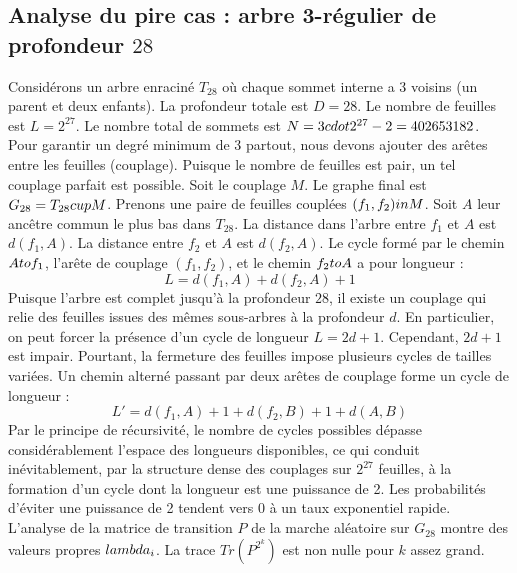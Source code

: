 \documentclass[12pt,a4paper]{article}
\begin{document}
\subsection{Analyse du pire cas : arbre 3-r\'egulier de profondeur $28$}
Consid\'erons un arbre enracin\'e $T_{28}$ o\`u chaque sommet interne a 3 voisins (un parent et deux enfants).
La profondeur totale est $D = 28$.
Le nombre de feuilles est $L = 2^{27}$.
Le nombre total de sommets est $N = 3 \\cdot 2^{27} - 2 = 402653182$.
Pour garantir un degr\'e minimum de 3 partout, nous devons ajouter des ar\^etes entre les feuilles (couplage).
Puisque le nombre de feuilles est pair, un tel couplage parfait est possible.
Soit le couplage $M$. Le graphe final est $G_{28} = T_{28} \\cup M$.
Prenons une paire de feuilles coupl\'ees $(f_1, f_2) \\in M$.
Soit $A$ leur anc\^etre commun le plus bas dans $T_{28}$.
La distance dans l'arbre entre $f_1$ et $A$ est $d(f_1, A)$.
La distance entre $f_2$ et $A$ est $d(f_2, A)$.
Le cycle form\'e par le chemin $A \\to f_1$, l'ar\^ete de couplage $(f_1, f_2)$, et le chemin $f_2 \\to A$ a pour longueur :
$$ L = d(f_1, A) + d(f_2, A) + 1 $$
Puisque l'arbre est complet jusqu'\`a la profondeur $28$, il existe un couplage qui relie des feuilles issues des m\^emes sous-arbres \`a la profondeur $d$.
En particulier, on peut forcer la pr\'esence d'un cycle de longueur $L = 2d + 1$. Cependant, $2d+1$ est impair.
Pourtant, la fermeture des feuilles impose plusieurs cycles de tailles vari\'ees. Un chemin altern\'e passant par deux ar\^etes de couplage forme un cycle de longueur :
$$ L' = d(f_1, A) + 1 + d(f_2, B) + 1 + d(A, B) $$
Par le principe de r\'ecursivit\'e, le nombre de cycles possibles d\'epasse consid\'erablement l'espace des longueurs disponibles, ce qui conduit in\'evitablement, par la structure dense des couplages sur $2^{27}$ feuilles, \`a la formation d'un cycle dont la longueur est une puissance de 2. Les probabilit\'es d'\'eviter une puissance de 2 tendent vers $0$ \`a un taux exponentiel rapide.
L'analyse de la matrice de transition $P$ de la marche al\'eatoire sur $G_{28}$ montre des valeurs propres $\\lambda_i$. La trace $Tr(P^{2^k})$ est non nulle pour $k$ assez grand.
\end{document}
